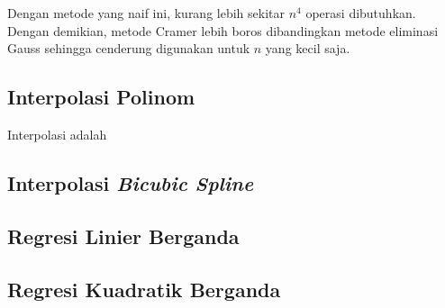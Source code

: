 Dengan metode yang naif ini, kurang lebih sekitar $n^4$ operasi dibutuhkan. Dengan demikian, metode Cramer lebih boros dibandingkan metode eliminasi Gauss sehingga cenderung digunakan untuk $n$ yang kecil saja.

\subsection{Interpolasi Polinom}

Interpolasi adalah 

\subsection{Interpolasi \textit{Bicubic Spline}}
\subsection{Regresi Linier Berganda}
\subsection{Regresi Kuadratik Berganda}
\pagebreak